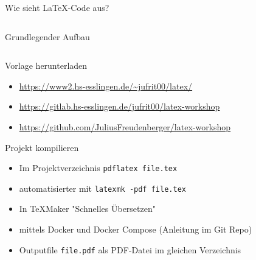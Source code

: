\documentclass[presentation,aspectratio=169]{beamer}
\begin{document}
\begin{frame}{Wie sieht \LaTeX-Code aus?}
  \inputminted{latex}{codebeispiele/beispiel.tex}
\end{frame}

\begin{frame}{Grundlegender Aufbau}
  \inputminted{latex}{codebeispiele/aufbau.tex}
\end{frame}

\begin{frame}{Vorlage herunterladen}
  \begin{itemize}
    \item \href{https://www2.hs-esslingen.de/~jufrit00/latex/}{https://www2.hs-esslingen.de/\textasciitilde{}jufrit00/latex/}
    \item \href{https://gitlab.hs-esslingen.de/jufrit00/latex-workshop}{https://gitlab.hs-esslingen.de/jufrit00/latex-workshop}
    \item \href{https://github.com/JuliusFreudenberger/latex-workshop}{https://github.com/JuliusFreudenberger/latex-workshop}
  \end{itemize}
\end{frame}

\begin{frame}[fragile]{Projekt kompilieren}
  \begin{itemize}
    \item Im Projektverzeichnis \verb|pdflatex file.tex|
    \item automatisierter mit \verb|latexmk -pdf file.tex|
    \item In \TeX{}Maker "Schnelles Übersetzen"
    \item mittels Docker und Docker Compose (Anleitung im Git Repo)
    \item Outputfile \verb|file.pdf| als PDF-Datei im gleichen Verzeichnis
  \end{itemize}
\end{frame}
\end{document}
